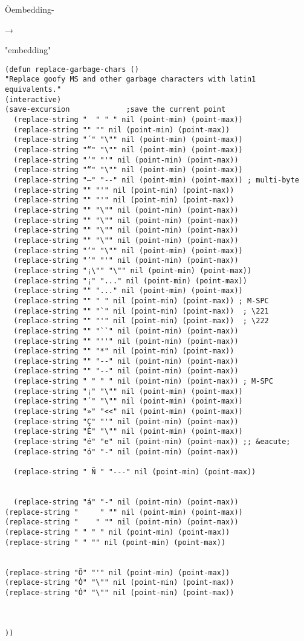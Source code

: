 \documentclass[11pt]{article}
\begin{document}
\label{sec:org5174ff1}

Òembedding-

→

"embedding"

\begin{verbatim}
(defun replace-garbage-chars ()
"Replace goofy MS and other garbage characters with latin1 equivalents."
(interactive)
(save-excursion				;save the current point
  (replace-string "  " " " nil (point-min) (point-max))
  (replace-string "" "" nil (point-min) (point-max))
  (replace-string "΄" "\"" nil (point-min) (point-max))
  (replace-string "“" "\"" nil (point-min) (point-max))
  (replace-string "’" "'" nil (point-min) (point-max))
  (replace-string "“" "\"" nil (point-min) (point-max))
  (replace-string "—" "--" nil (point-min) (point-max)) ; multi-byte
  (replace-string "" "'" nil (point-min) (point-max))
  (replace-string "" "'" nil (point-min) (point-max))
  (replace-string "" "\"" nil (point-min) (point-max))
  (replace-string "" "\"" nil (point-min) (point-max))
  (replace-string "" "\"" nil (point-min) (point-max))
  (replace-string "" "\"" nil (point-min) (point-max))
  (replace-string "‘" "\"" nil (point-min) (point-max))
  (replace-string "’" "'" nil (point-min) (point-max))
  (replace-string "¡\"" "\"" nil (point-min) (point-max))
  (replace-string "¡­" "..." nil (point-min) (point-max))
  (replace-string "" "..." nil (point-min) (point-max))
  (replace-string "" " " nil (point-min) (point-max)) ; M-SPC
  (replace-string "" "`" nil (point-min) (point-max))  ; \221
  (replace-string "" "'" nil (point-min) (point-max))  ; \222
  (replace-string "" "``" nil (point-min) (point-max))
  (replace-string "" "''" nil (point-min) (point-max))
  (replace-string "" "*" nil (point-min) (point-max))
  (replace-string "" "--" nil (point-min) (point-max))
  (replace-string "" "--" nil (point-min) (point-max))
  (replace-string " " " " nil (point-min) (point-max)) ; M-SPC
  (replace-string "¡" "\"" nil (point-min) (point-max))
  (replace-string "´" "\"" nil (point-min) (point-max))
  (replace-string "»" "<<" nil (point-min) (point-max))
  (replace-string "Ç" "'" nil (point-min) (point-max))
  (replace-string "È" "\"" nil (point-min) (point-max))
  (replace-string "é" "e" nil (point-min) (point-max)) ;; &eacute;
  (replace-string "ó" "-" nil (point-min) (point-max))

  (replace-string " Ñ " "---" nil (point-min) (point-max))


  (replace-string "á" "-" nil (point-min) (point-max))
(replace-string "     " "" nil (point-min) (point-max))
(replace-string "    " "" nil (point-min) (point-max))
(replace-string " " " " nil (point-min) (point-max))
(replace-string " " "" nil (point-min) (point-max))


(replace-string "Õ" "'" nil (point-min) (point-max))
(replace-string "Ò" "\"" nil (point-min) (point-max))
(replace-string "Ó" "\"" nil (point-min) (point-max))



))
\end{verbatim}
\end{document}
